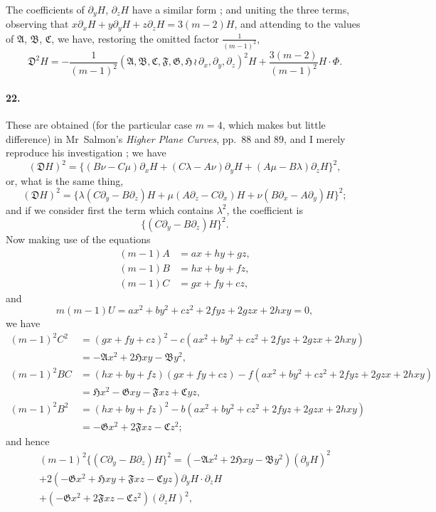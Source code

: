 \documentclass[11pt,a4paper]{book}
\begin{document}
The  coefficients  of  $\partial_y H$,  $\partial_z H$  have  a  similar  form ;  and  uniting  the  three  terms,
observing   that  $x\partial_x H + y\partial_y H + z\partial_z H = 3(m-2)H$,  and   attending  to  the  values
of  $\mathfrak{A}$,  $\mathfrak{B}$,  $\mathfrak{C}$,  we  have,  restoring  the  omitted  factor  $\frac{1}{(m-1)^2}$,
\[
\mathfrak{D}^2 H = -\frac{1}{(m-1)^2}(\mathfrak{A}, \mathfrak{B}, \mathfrak{C}, \mathfrak{F}, \mathfrak{G}, \mathfrak{H} \,\!\!\wr\, \partial_x, \partial_y, \partial_z)^2 H + \frac{3(m-2)}{(m-1)^2} H \cdot \Phi.
\]


\paragraph{22.}
These  are  obtained  (for  the  particular  case  $m = 4$,  which  makes  but  little
difference)  in  Mr~Salmon's  \textit{Higher  Plane  Curves},  pp.~88  and  89,  and  I  merely  reproduce
his  investigation ;    we  have
\[
(\mathfrak{D} H)^2 = \{(B\nu - C\mu)\partial_x H + (C\lambda - A\nu)\partial_y H + (A\mu - B\lambda)\partial_z H\}^2,
\]
or,  what  is  the  same  thing,
\[
(\mathfrak{D} H)^2 = \{\lambda(C\partial_y - B\partial_z)H + \mu(A\partial_z - C\partial_x)H + \nu(B\partial_x - A\partial_y)H\}^2;
\]
and  if  we  consider  first  the  term  which  contains  $\lambda^2$,  the  coefficient  is
\[
\{(C\partial_y - B\partial_z)H\}^2.
\]
Now  making  use  of  the  equations
\begin{align*}
(m-1)A &= ax + hy + gz, \\
(m-1)B &= hx + by + fz, \\
(m-1)C &= gx + fy + cz,
\end{align*}
and
\[
m(m-1)U = ax^2 + by^2 + cz^2 + 2fyz + 2gzx + 2hxy = 0,
\]
we   have
\begin{align*}
(m-1)^2 C^2 &= (gx + fy + cz)^2 - c(ax^2 + by^2 + cz^2 + 2fyz + 2gzx + 2hxy) \\
&= -\mathfrak{A}x^2 + 2\mathfrak{H}xy - \mathfrak{B}y^2, \\
(m-1)^2 BC &= (hx + by + fz)(gx + fy + cz) - f(ax^2 + by^2 + cz^2 + 2fyz + 2gzx + 2hxy) \\
&= \mathfrak{H}x^2 - \mathfrak{G}xy - \mathfrak{F}xz + \mathfrak{C}yz, \\
(m-1)^2 B^2 &= (hx + by + fz)^2 - b(ax^2 + by^2 + cz^2 + 2fyz + 2gzx + 2hxy) \\
&= -\mathfrak{G}x^2 + 2\mathfrak{F}xz - \mathfrak{C}z^2;
\end{align*}
and  hence
\begin{multline*}
(m-1)^2 \{(C\partial_y - B\partial_z)H\}^2 = (-\mathfrak{A}x^2 + 2\mathfrak{H}xy - \mathfrak{B}y^2)(\partial_y H)^2 \\
+ 2(-\mathfrak{G}x^2 + \mathfrak{H}xy + \mathfrak{F}xz - \mathfrak{C}yz) \partial_y H \cdot \partial_z H \\
+ (-\mathfrak{G}x^2 + 2\mathfrak{F}xz - \mathfrak{C}z^2)(\partial_z H)^2,
\end{multline*}
\end{document}
